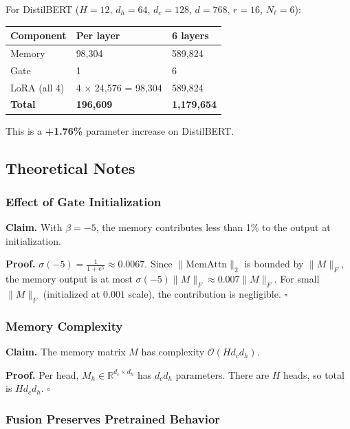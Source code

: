For DistilBERT ($H = 12$, $d_h = 64$, $d_c = 128$, $d = 768$, $r = 16$, 
$N_\ell = 6$):

\begin{table}[H]
\centering
\small
\begin{tabular}{lll}
\toprule
\textbf{Component} & \textbf{Per layer} & \textbf{6 layers} \\
\midrule
Memory & 98,304 & 589,824 \\
Gate & 1 & 6 \\
LoRA (all 4) & 4 $\times$ 24,576 = 98,304 & 589,824 \\
\textbf{Total} & \textbf{196,609} & \textbf{1,179,654} \\
\bottomrule
\end{tabular}
\end{table}

This is a \textbf{+1.76\%} parameter increase on DistilBERT.

\subsection{Theoretical Notes}

\subsubsection{Effect of Gate Initialization}

\textbf{Claim.} With $\beta = -5$, the memory contributes less than 1\% to the 
output at initialization.

\textbf{Proof.} $\sigma(-5) = \frac{1}{1 + e^5} \approx 0.0067$. Since 
$\|\text{MemAttn}\|_2$ is bounded by $\|M\|_F$, the memory output is at 
most $\sigma(-5) \|M\|_F \approx 0.007 \|M\|_F$. For small $\|M\|_F$ 
(initialized at $0.001$ scale), the contribution is negligible. $\square$

\subsubsection{Memory Complexity}

\textbf{Claim.} The memory matrix $M$ has complexity $\mathcal{O}(H d_c d_h)$.

\textbf{Proof.} Per head, $M_h \in \mathbb{R}^{d_c \times d_h}$ has $d_c d_h$ 
parameters. There are $H$ heads, so total is $H d_c d_h$. $\square$

\subsubsection{Fusion Preserves Pretrained Behavior}

